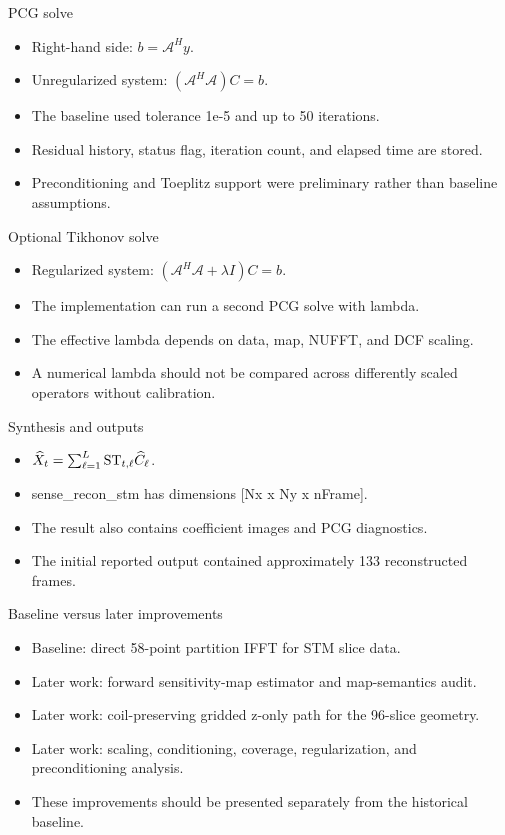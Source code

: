 \documentclass[aspectratio=169,professionalfonts]{beamer}
\begin{document}
\begin{frame}{PCG solve}
\begin{itemize}
\item Right-hand side: $b=\mathcal{A}^H y$.
\item Unregularized system: $(\mathcal{A}^H\mathcal{A})C=b$.
\item The baseline used tolerance 1e-5 and up to 50 iterations.
\item Residual history, status flag, iteration count, and elapsed time are stored.
\item Preconditioning and Toeplitz support were preliminary rather than baseline assumptions.
\end{itemize}
\end{frame}
\begin{frame}{Optional Tikhonov solve}
\begin{itemize}
\item Regularized system: $(\mathcal{A}^H\mathcal{A}+\lambda I)C=b$.
\item The implementation can run a second PCG solve with lambda.
\item The effective lambda depends on data, map, NUFFT, and DCF scaling.
\item A numerical lambda should not be compared across differently scaled operators without calibration.
\end{itemize}
\end{frame}
\begin{frame}{Synthesis and outputs}
\begin{itemize}
\item $\widehat{X}_t=\sum_{\ell=1}^{L}{\rm ST}_{t,\ell}\widehat{C}_\ell$.
\item sense\_recon\_stm has dimensions [Nx x Ny x nFrame].
\item The result also contains coefficient images and PCG diagnostics.
\item The initial reported output contained approximately 133 reconstructed frames.
\end{itemize}
\end{frame}
\begin{frame}{Baseline versus later improvements}
\begin{itemize}
\item Baseline: direct 58-point partition IFFT for STM slice data.
\item Later work: forward sensitivity-map estimator and map-semantics audit.
\item Later work: coil-preserving gridded z-only path for the 96-slice geometry.
\item Later work: scaling, conditioning, coverage, regularization, and preconditioning analysis.
\item These improvements should be presented separately from the historical baseline.
\end{itemize}
\end{frame}
\end{document}
